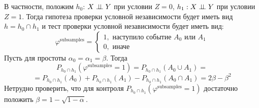 В частности, положим $h_0$: $X \perp\!\!\!\perp Y$ при условии $Z=0$, $h_1: X \perp\!\!\!\perp Y$ при условии $Z=1$. Тогда гипотеза проверки
условной независимости будет иметь вид $h = h_0 \cap h_1$ и тест проверки условной независимости будет иметь вид:
$$
\varphi^{\text{subsamples}}=\begin{cases}
    1, \text{ наступило событие $A_0$ или $A_1$}\\
    0, \text{ иначе}
\end{cases}
$$
Пусть для простоты $\alpha_0 = \alpha_1 = \beta$.
Тогда $$P_{h_0 \cap h_1}(\varphi^{\text{subsamples}}=1)=P_{h_0 \cap h_1}(A_0 \cup A_1)=$$ 
$$ = P_{h_0 \cap h_1}(A_0) + P_{h_0 \cap h_1}(A_1) - 
P_{h_0 \cap h_1}(A_0 \cap A_1) = 2\beta - \beta^2$$
Нетрудно проверить, что для контроля $P_{h_0 \cap h_1}(\varphi^{\text{subsamples}}=1)$ достаточно положить
$\beta = 1 - \sqrt{1-\alpha}$.
